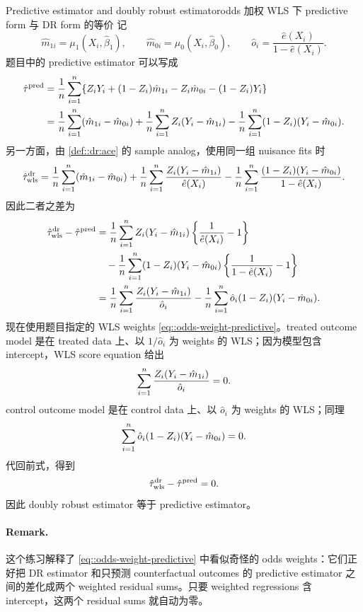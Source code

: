 \begin{exercisesolution}{Predictive estimator and doubly robust estimator}{odds 加权 WLS 下 predictive form 与 DR form 的等价}
记
\[
\hat m_{1i}=\mu_1(X_i,\hat\beta_1),\qquad
\hat m_{0i}=\mu_0(X_i,\hat\beta_0),\qquad
\hat o_i=\frac{\hat e(X_i)}{1-\hat e(X_i)}.
\]
题目中的 predictive estimator 可以写成
\begin{align*}
\hat\tau^{\textup{pred}}
&=\frac{1}{n}\sum_{i=1}^n
\{Z_iY_i+(1-Z_i)\hat m_{1i}
-Z_i\hat m_{0i}-(1-Z_i)Y_i\}\\
&=\frac{1}{n}\sum_{i=1}^n(\hat m_{1i}-\hat m_{0i})
  +\frac{1}{n}\sum_{i=1}^n Z_i(Y_i-\hat m_{1i})
  -\frac{1}{n}\sum_{i=1}^n (1-Z_i)(Y_i-\hat m_{0i}).
\end{align*}
另一方面，由 \cref{def::dr:ace} 的 sample analog，使用同一组 nuisance fits 时
\[
\hat\tau_{\textup{wls}}^{\textup{dr}}
=\frac{1}{n}\sum_{i=1}^n(\hat m_{1i}-\hat m_{0i})
  +\frac{1}{n}\sum_{i=1}^n \frac{Z_i(Y_i-\hat m_{1i})}{\hat e(X_i)}
  -\frac{1}{n}\sum_{i=1}^n
       \frac{(1-Z_i)(Y_i-\hat m_{0i})}{1-\hat e(X_i)}.
\]
因此二者之差为
\begin{align*}
\hat\tau_{\textup{wls}}^{\textup{dr}}-\hat\tau^{\textup{pred}}
&=\frac{1}{n}\sum_{i=1}^n
Z_i(Y_i-\hat m_{1i})
\left\{\frac{1}{\hat e(X_i)}-1\right\}\\
&\quad
-\frac{1}{n}\sum_{i=1}^n
(1-Z_i)(Y_i-\hat m_{0i})
\left\{\frac{1}{1-\hat e(X_i)}-1\right\}\\
&=\frac{1}{n}\sum_{i=1}^n
\frac{Z_i(Y_i-\hat m_{1i})}{\hat o_i}
-\frac{1}{n}\sum_{i=1}^n
\hat o_i(1-Z_i)(Y_i-\hat m_{0i}).
\end{align*}
现在使用题目指定的 WLS weights \cref{eq::odds-weight-predictive}。treated outcome model 是在 treated data 上、以 $1/\hat o_i$ 为 weights 的 WLS；因为模型包含 intercept，WLS score equation 给出
\[
\sum_{i=1}^n \frac{Z_i(Y_i-\hat m_{1i})}{\hat o_i}=0.
\]
control outcome model 是在 control data 上、以 $\hat o_i$ 为 weights 的 WLS；同理
\[
\sum_{i=1}^n \hat o_i(1-Z_i)(Y_i-\hat m_{0i})=0.
\]
代回前式，得到
\[
\hat\tau_{\textup{wls}}^{\textup{dr}}-\hat\tau^{\textup{pred}}=0.
\]
因此 doubly robust estimator 等于 predictive estimator。

\paragraph{Remark.}
这个练习解释了 \cref{eq::odds-weight-predictive} 中看似奇怪的 odds weights：它们正好把 DR estimator 和只预测 counterfactual outcomes 的 predictive estimator 之间的差化成两个 weighted residual sums。只要 weighted regressions 含 intercept，这两个 residual sums 就自动为零。
\end{exercisesolution}

